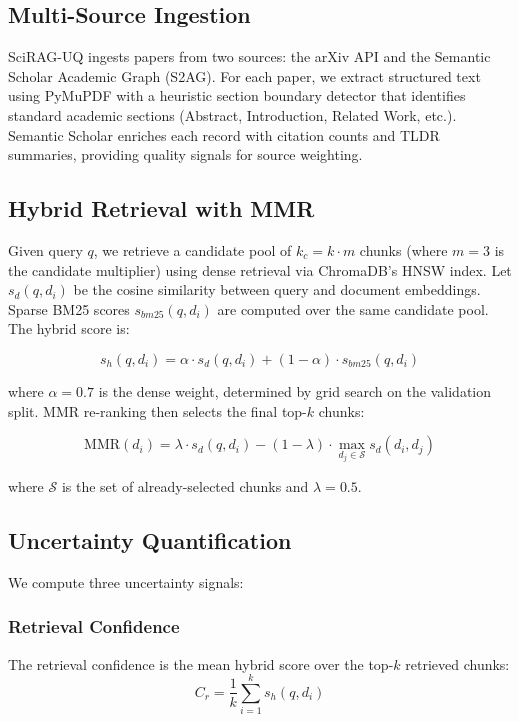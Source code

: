 \documentclass[conference]{IEEEtran}
\begin{document}
\subsection{Multi-Source Ingestion}

SciRAG-UQ ingests papers from two sources: the arXiv API and the Semantic Scholar
Academic Graph (S2AG). For each paper, we extract structured text using PyMuPDF
with a heuristic section boundary detector that identifies standard academic
sections (Abstract, Introduction, Related Work, etc.). Semantic Scholar enriches
each record with citation counts and TLDR summaries, providing quality signals
for source weighting.

\subsection{Hybrid Retrieval with MMR}

Given query $q$, we retrieve a candidate pool of $k_c = k \cdot m$ chunks
(where $m=3$ is the candidate multiplier) using dense retrieval via ChromaDB's
HNSW index. Let $s_d(q, d_i)$ be the cosine similarity between query and
document embeddings. Sparse BM25 scores $s_{bm25}(q, d_i)$ are computed over
the same candidate pool. The hybrid score is:

\begin{equation}
s_h(q, d_i) = \alpha \cdot s_d(q, d_i) + (1 - \alpha) \cdot s_{bm25}(q, d_i)
\label{eq:hybrid}
\end{equation}

where $\alpha = 0.7$ is the dense weight, determined by grid search on the
validation split. MMR re-ranking then selects the final top-$k$ chunks:

\begin{equation}
\text{MMR}(d_i) = \lambda \cdot s_d(q, d_i)
                 - (1-\lambda) \cdot \max_{d_j \in \mathcal{S}} s_d(d_i, d_j)
\label{eq:mmr}
\end{equation}

where $\mathcal{S}$ is the set of already-selected chunks and $\lambda = 0.5$.

\subsection{Uncertainty Quantification}
\label{sec:uq}

We compute three uncertainty signals:

\subsubsection{Retrieval Confidence}
The retrieval confidence is the mean hybrid score over the top-$k$ retrieved
chunks:
\begin{equation}
C_r = \frac{1}{k} \sum_{i=1}^{k} s_h(q, d_i)
\label{eq:ret_conf}
\end{equation}
\end{document}
